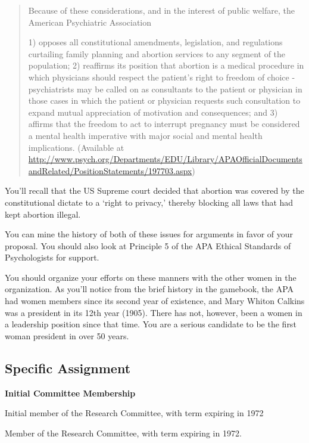 \begin{refsection}
\begin{quote}
Because of these considerations, and in the interest of public welfare, the American Psychiatric Association

1) opposes all constitutional amendments, legislation, and regulations curtailing family planning and abortion services to any segment of the population; 2) reaffirms its position that abortion is a medical procedure in which physicians should respect the patient's right to freedom of choice - psychiatrists may be called on as consultants to the patient or physician in those cases in which the patient or physician requests such consultation to expand mutual appreciation of motivation and consequences; and 3) affirms that the freedom to act to interrupt pregnancy must be considered a mental health imperative with major social and mental health implications.⁠ (Available at \url{http://www.psych.org/Departments/EDU/Library/APAOfficialDocumentsandRelated/PositionStatements/197703.aspx})
\end{quote}

You'll recall that the US Supreme court decided that abortion was covered by the constitutional dictate to a `right to privacy,' thereby blocking all laws that had kept abortion illegal.

You can mine the history of both of these issues for arguments in favor of your proposal. You should also look at Principle 5 of the APA Ethical Standards of Psychologists for support.

You should organize your efforts on these manners with the other women in the organization. As you'll notice from the brief history in the gamebook, the APA had women members since its second year of existence, and Mary Whiton Calkins was a president in its 12th year (1905). There has not, however, been a women in a leadership position since that time. You are a serious candidate to be the first woman president in over 50 years.

\subsection{Specific Assignment}
\label{specificassignment}

\textbf{Initial Committee Membership}
\begin{service}[Tyler]\label{service:tyler}
Initial member of the Research Committee, with term expiring in 1972
\end{service}

Member of the Research Committee, with term expiring in 1972.


\end{refsection}
